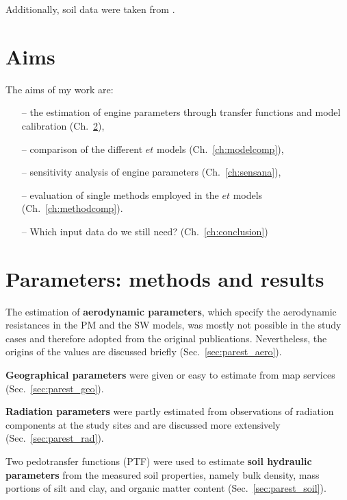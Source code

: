 \documentclass{scrreprt}
\begin{document}
Additionally, soil data were taken from \citet{mroos14}.


\chapter{Aims} \label{ch:aims}

The aims of my work are:
\begin{itemize}
  \item[--] the estimation of engine parameters through transfer functions and model calibration (Ch.~\ref{ch:parest}),
  \item[--] comparison of the different $et$ models (Ch.~\ref{ch:modelcomp}),
  \item[--] sensitivity analysis of engine parameters (Ch.~\ref{ch:sensana}),
  \item[--] evaluation of single methods employed in the $et$ models (Ch.~\ref{ch:methodcomp}).
  \item[--] Which input data do we still need? (Ch.~\ref{ch:conclusion})
\end{itemize}


\chapter{Parameters: methods and results} \label{ch:parest}

The estimation of \textbf{aerodynamic parameters}, which specify the aerodynamic resistances in the PM and the SW models, was mostly not possible in the study cases and therefore adopted from the original publications.
Nevertheless, the origins of the values are discussed briefly (Sec.~\ref{sec:parest_aero}).

\textbf{Geographical parameters} were given or easy to estimate from map services (Sec.~\ref{sec:parest_geo}).

\textbf{Radiation parameters} were partly estimated from observations of radiation components at the study sites and are discussed more extensively (Sec.~\ref{sec:parest_rad}).

Two pedotransfer functions (PTF) were used to estimate \textbf{soil hydraulic parameters} from the measured soil properties, namely bulk density, mass portions of silt and clay, and organic matter content (Sec.~\ref{sec:parest_soil}).
\end{document}
